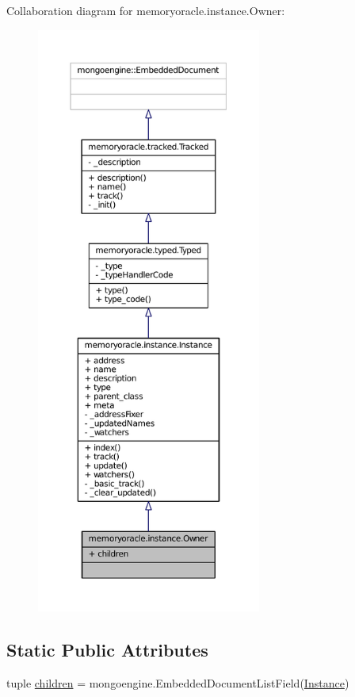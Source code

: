Collaboration diagram for memoryoracle.\+instance.\+Owner\+:\nopagebreak
\begin{figure}[H]
\begin{center}
\leavevmode
\includegraphics[height=550pt]{classmemoryoracle_1_1instance_1_1Owner__coll__graph}
\end{center}
\end{figure}
\subsection*{Static Public Attributes}
\begin{DoxyCompactItemize}
\item 
tuple \hyperlink{classmemoryoracle_1_1instance_1_1Owner_a412932bf9f72a82d00452a2944e120de}{children} = mongoengine.\+Embedded\+Document\+List\+Field(\hyperlink{classmemoryoracle_1_1instance_1_1Instance}{Instance})
\end{DoxyCompactItemize}
